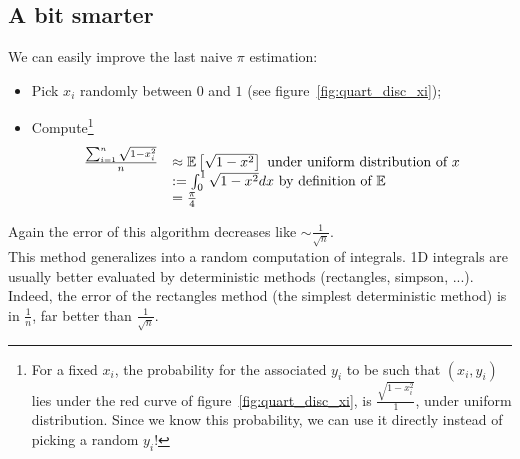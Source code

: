 \subsection{A bit smarter}

We can easily improve the last naive $\pi$ estimation:
\begin{itemize}
	\item Pick $x_i$ randomly between $0$ and $1$ (see figure~\ref{fig:quart_disc_xi});
	\item Compute\footnote{For a fixed $x_i$, the probability for the associated $y_i$ to be such that $(x_i,y_i)$ lies under the red curve of figure~\ref{fig:quart_disc_xi}, is $\frac{\sqrt{1-x_i^2}}{1}$, under uniform distribution. Since we know this probability, we can use it directly instead of picking a random $y_i$!}
\[
	\begin{array}{ll}
	\frac{\sum_{i=1}^n{\sqrt{1-x_i^2}}}{n}&\approx \mathbb{E}\left[\sqrt{1-x^2}\right] \text{  under uniform distribution of }x\\
	&:=\int_{0}^1{\sqrt{1-x^2} dx} \text{  by definition of } \mathbb{E}\\
	&=\frac{\pi}{4}
	\end{array}
\]
\end{itemize}

Again the error of this algorithm decreases like $\sim \frac{1}{\sqrt{n}}$.\\

This method generalizes into a random computation of integrals. 1D integrals are usually better evaluated by deterministic methods (rectangles, simpson, ...). Indeed, the error of the rectangles method (the simplest deterministic method) is in $\frac{1}{n}$, far better than $\frac{1}{\sqrt{n}}$.

